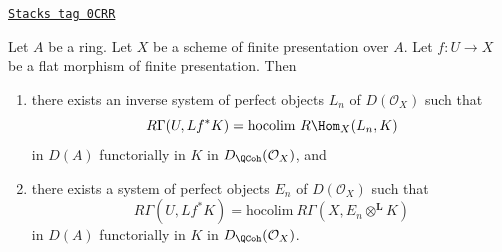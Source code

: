 \begin{lemma}
\label{perfect-lemma-computing-sections-as-colim}
\href{https://stacks.math.columbia.edu/tag/0CRR}{\texttt{Stacks tag 0CRR}}

Let $A$ be a ring. Let $X$ be a scheme of finite presentation over $A$.
Let $f : U \to X$ be a flat morphism of finite presentation. Then
\begin{enumerate}
\item there exists an inverse system of perfect objects $L_n$ of
$D(\mathcal{O}_X)$ such that
$$
R\Gamma(U, Lf^*K) = \text{hocolim}\ R\Hom_X(L_n, K)
$$
in $D(A)$ functorially in $K$ in $D_\QCoh(\mathcal{O}_X)$, and
\item there exists a system of perfect objects $E_n$ of
$D(\mathcal{O}_X)$ such that
$$
R\Gamma(U, Lf^*K) = \text{hocolim}\ R\Gamma(X, E_n \otimes^\mathbf{L} K)
$$
in $D(A)$ functorially in $K$ in $D_\QCoh(\mathcal{O}_X)$.
\end{enumerate}
\end{lemma}

